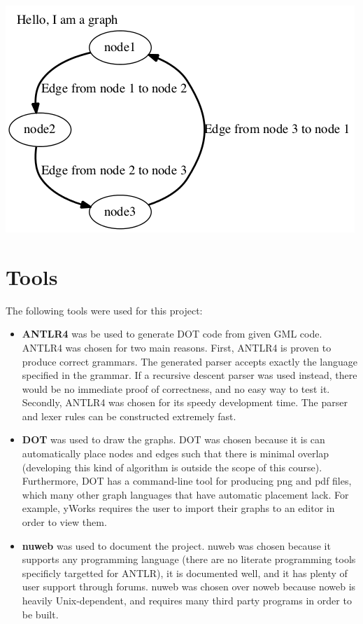 \documentclass[a4paper]{report}
\begin{document}
 \begin{center}
 \includegraphics[scale=0.5]{test}
 \end{center}
 
\section{Tools}
The following tools were used for this project:
\begin{itemize}
\item \textbf{ANTLR4}\cite{ANTLR4} was be used to generate DOT code from given GML code. ANTLR4 was chosen for two main reasons. First, ANTLR4 is proven to produce correct grammars. The generated parser accepts exactly the language specified in the grammar. If a recursive descent parser was used instead, there would be no immediate proof of correctness, and no easy way to test it. Secondly, ANTLR4 was chosen for its speedy development time. The parser and lexer rules can be constructed extremely fast.
\item \textbf{DOT}\cite{DOT} was used to draw the graphs. DOT was chosen because it is can automatically place nodes and edges such that there is minimal overlap (developing this kind of algorithm is outside the scope of this course). Furthermore, DOT has a command-line tool for producing png and pdf files, which many other graph languages that have automatic placement lack. For example, yWorks\cite{YWORKS} requires the user to import their graphs to an editor in order to view them.
\item \textbf{nuweb}\cite{NUWEB} was used to document the project. nuweb was chosen because it supports any programming language (there are no literate programming tools specificly targetted for ANTLR), it is documented well, and it has plenty of user support through forums. nuweb was chosen over noweb because noweb is heavily Unix-dependent, and requires many third party programs in order to be built.
\end{itemize}
\end{document}
